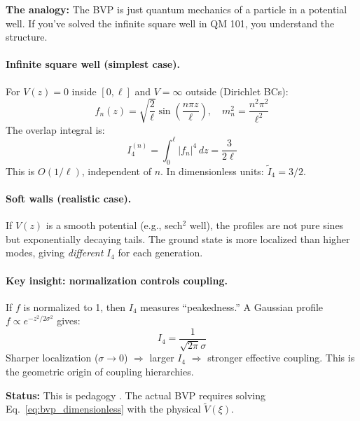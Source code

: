 \begin{tcolorbox}[colback=yellow!5!white, colframe=yellow!50!black,
    title=\textbf{Toy Model: Particle in a 1D Box with Soft Walls}]

\textbf{The analogy:} The BVP is just quantum mechanics of a particle in a potential
well. If you've solved the infinite square well in QM 101, you understand the structure.

\paragraph{Infinite square well (simplest case).}
For $V(z) = 0$ inside $[0, \ell]$ and $V = \infty$ outside (Dirichlet BCs):
\[
    f_n(z) = \sqrt{\frac{2}{\ell}} \sin\left(\frac{n\pi z}{\ell}\right), \quad
    m_n^2 = \frac{n^2 \pi^2}{\ell^2}
\]
The overlap integral is:
\[
    I_4^{(n)} = \int_0^\ell |f_n|^4 \, dz = \frac{3}{2\ell}
\]
This is $O(1/\ell)$, independent of $n$. In dimensionless units: $\tilde{I}_4 = 3/2$.

\paragraph{Soft walls (realistic case).}
If $V(z)$ is a smooth potential (e.g., sech$^2$ well), the profiles are not pure
sines but exponentially decaying tails. The ground state is more localized than
higher modes, giving \emph{different} $I_4$ for each generation.

\paragraph{Key insight: normalization controls coupling.}
If $f$ is normalized to 1, then $I_4$ measures ``peakedness.'' A Gaussian profile
$f \propto e^{-z^2/2\sigma^2}$ gives:
\[
    I_4 = \frac{1}{\sqrt{2\pi}\sigma}
\]
Sharper localization ($\sigma \to 0$) $\Rightarrow$ larger $I_4$ $\Rightarrow$
stronger effective coupling. This is the geometric origin of coupling hierarchies.

\textbf{Status:} This is pedagogy \tagM{}. The actual BVP requires solving
Eq.~\eqref{eq:bvp_dimensionless} with the physical $\tilde{V}(\xi)$.
\end{tcolorbox}


